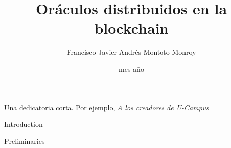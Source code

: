 \documentclass[upright, contnum]{umemoria}
\author{Francisco Javier Andr\'es Montoto Monroy}
\title{Or\'aculos distribuidos en la blockchain}
\date{mes {a\~no}}
\begin{document}
\frontmatter
\maketitle

\begin{abstract}
	
\end{abstract}

\begin{dedicatoria} %
	Una dedicatoria corta. Por ejemplo, \emph{A los creadores de U-Campus}
\end{dedicatoria}

\begin{thanks} %
	\lipsum[1-2]
\end{thanks}
\cleardoublepage
{}
\tableofcontents
\listoftables %
\listoffigures %

\mainmatter

\begin{my_section}{Introduction}
	
	
\end{my_section}

\begin{my_section}{Preliminaries}
	
	
\end{my_section}





\printbibliography
\end{document}

